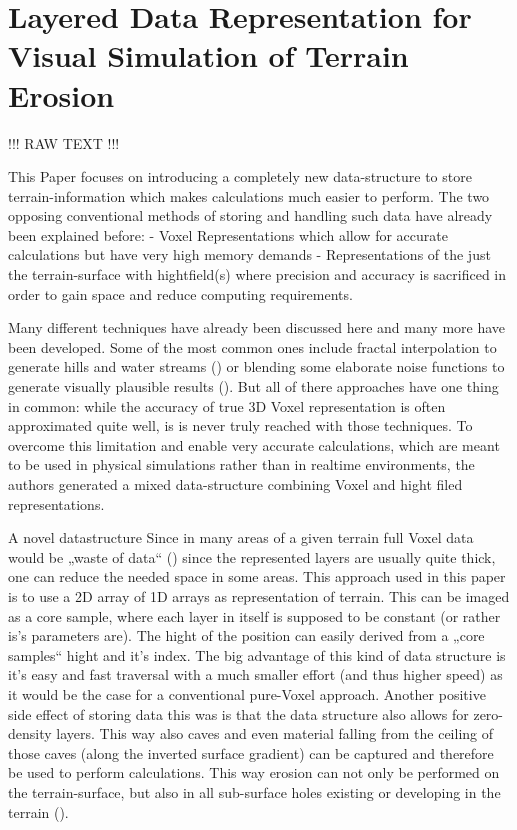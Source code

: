 \section{Layered Data Representation for Visual Simulation of Terrain Erosion}

\cite{marechal2010heat}
!!! RAW TEXT !!!

This Paper focuses on introducing a completely new data-structure to store terrain-information which makes calculations much easier to perform. The two opposing conventional methods of storing and handling such data have already been explained before:
- Voxel Representations which allow for accurate calculations but have very high memory demands
- Representations of the just the terrain-surface with hightfield(s) where precision and accuracy is sacrificed in order to gain space and reduce computing requirements.

Many different techniques have already been discussed here and many more have been developed. Some of the most common ones include fractal interpolation to generate hills and water streams () or blending some elaborate noise functions to generate visually plausible results (). But all of there approaches have one thing in common: while the accuracy of true 3D Voxel representation is often approximated quite well, is is never truly reached with those techniques.
To overcome this limitation and enable very accurate calculations, which are meant to be used in physical simulations rather than in realtime environments, the authors generated a mixed data-structure combining Voxel and hight filed representations.

A novel datastructure
Since in many areas of a given terrain full Voxel data would be „waste  of data“ () since the represented layers are usually quite thick, one can reduce the needed space in some areas. This approach used in this paper is to use a 2D array of 1D arrays as representation of terrain. This can be  imaged as a core sample, where each layer in itself is supposed to be constant (or rather is’s parameters are). The hight of the position can easily derived from a „core samples“ hight and it’s index.
The big advantage of this kind of data structure is it’s easy and fast traversal with a much smaller effort (and thus higher speed) as it would be the case for a conventional pure-Voxel approach. Another positive side effect of storing data this was is that the data structure also allows for zero-density layers. This way also caves and even material falling from the ceiling of those caves (along the inverted surface gradient) can be captured and therefore be used to perform calculations. This way erosion can not only be performed on the terrain-surface, but also in all sub-surface holes existing or developing in the terrain ().


